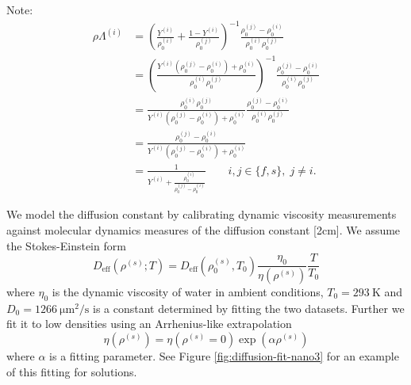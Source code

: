 \documentclass[11pt,twoside]{report}
\begin{document}
Note:
\begin{equation}
  \begin{aligned}
    \rho \Lambda^{(i)} &=
    \left(
    \frac{Y^{(i)}}{\rho^{(i)}_0} +
    \frac{1 - Y^{(i)}}{\rho^{(j)}_0}
    \right)^{-1}
    \frac{\rho^{(j)}_0 - \rho^{(i)}_0}{\rho^{(i)}_0\rho^{(j)}_0} \\
    &=
    \left(
    \frac{Y^{(i)} (\rho^{(j)}_0 - \rho^{(i)}_0) + \rho^{(i)}_0}{\rho^{(i)}_0 \rho^{(j)}_0}
    \right)^{-1}
    \frac{\rho^{(j)}_0 - \rho^{(i)}_0}{\rho^{(i)}_0\rho^{(j)}_0}
    \\
    &=
    \frac{\rho^{(i)}_0 \rho^{(j)}_0}{Y^{(i)} (\rho^{(j)}_0 - \rho^{(i)}_0) + \rho^{(i)}_0}
    \frac{\rho^{(j)}_0 - \rho^{(i)}_0}{\rho^{(i)}_0\rho^{(j)}_0}
    \\
    &=
    \frac{\rho^{(j)}_0 - \rho^{(i)}_0}{Y^{(i)} (\rho^{(j)}_0 - \rho^{(i)}_0) + \rho^{(i)}_0}
    \\
    &=
    \frac{1}{Y^{(i)} + \frac{\rho^{(i)}_0}{\rho^{(j)}_0 - \rho^{(i)}_0}}
    \qquad i,j \in \{f,s\}, \; j \ne i.
  \end{aligned}
\end{equation}

We model the diffusion constant by calibrating dynamic viscosity measurements
 against molecular dynamics measures of the diffusion constant [2cm].
We assume the Stokes-Einstein form
\begin{equation}
  D_{\textrm{eff}}(\rho^{(s)};T) = D_{\textrm{eff}}(\rho_0^{(s)}, T_0) \frac{\eta_0}{\eta(\rho^{(s)})} \frac{T}{T_0}
\end{equation}
where $\eta_0$ is the dynamic viscosity of water in ambient conditions, $T_0 = \SI{293}{\kelvin}$ and $D_0 = \SI{1266}{\micro\metre^2\per\second}$ is a constant determined by fitting the two datasets.
Further we fit it to low densities using an Arrhenius-like extrapolation
\begin{equation}
  \eta(\rho^{(s)}) = \eta(\rho^{(s)} = 0) \exp{\left( \alpha \rho^{(s)} \right)}
\end{equation}
where $\alpha$ is a fitting parameter.
See Figure \ref{fig:diffusion-fit-nano3} for an example of this fitting for  solutions.
\end{document}
